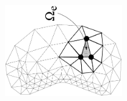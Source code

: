 \begin{frame}
\begin{columns}[t]
{      }
      \begin{center}
	      \includegraphics[width=2in,angle=-90]{figures/phi_ijk}
      \end{center}
    \end{columns}
\end{frame}
